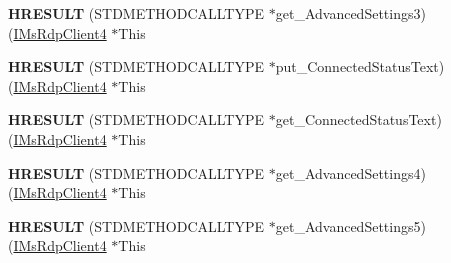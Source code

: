 \begin{DoxyCompactItemize}
\item 
\mbox{\label{struct_m_s_t_s_c_lib_1_1_i_ms_rdp_client4_vtbl_a762e2160b5d5edd9b0a4a5a1e54d4ee4}} 
{\bfseries H\+R\+E\+S\+U\+LT} (S\+T\+D\+M\+E\+T\+H\+O\+D\+C\+A\+L\+L\+T\+Y\+PE $\ast$get\+\_\+\+Advanced\+Settings3)(\hyperlink{interface_m_s_t_s_c_lib_1_1_i_ms_rdp_client4}{I\+Ms\+Rdp\+Client4} $\ast$This
\item 
\mbox{\label{struct_m_s_t_s_c_lib_1_1_i_ms_rdp_client4_vtbl_a541134b0de7063e4a7af019ff46db7f2}} 
{\bfseries H\+R\+E\+S\+U\+LT} (S\+T\+D\+M\+E\+T\+H\+O\+D\+C\+A\+L\+L\+T\+Y\+PE $\ast$put\+\_\+\+Connected\+Status\+Text)(\hyperlink{interface_m_s_t_s_c_lib_1_1_i_ms_rdp_client4}{I\+Ms\+Rdp\+Client4} $\ast$This
\item 
\mbox{\label{struct_m_s_t_s_c_lib_1_1_i_ms_rdp_client4_vtbl_a8b44dbcad6ae83ad35ce763c59aec175}} 
{\bfseries H\+R\+E\+S\+U\+LT} (S\+T\+D\+M\+E\+T\+H\+O\+D\+C\+A\+L\+L\+T\+Y\+PE $\ast$get\+\_\+\+Connected\+Status\+Text)(\hyperlink{interface_m_s_t_s_c_lib_1_1_i_ms_rdp_client4}{I\+Ms\+Rdp\+Client4} $\ast$This
\item 
\mbox{\label{struct_m_s_t_s_c_lib_1_1_i_ms_rdp_client4_vtbl_ac22394ffcf9e4ce2fe624121bd734022}} 
{\bfseries H\+R\+E\+S\+U\+LT} (S\+T\+D\+M\+E\+T\+H\+O\+D\+C\+A\+L\+L\+T\+Y\+PE $\ast$get\+\_\+\+Advanced\+Settings4)(\hyperlink{interface_m_s_t_s_c_lib_1_1_i_ms_rdp_client4}{I\+Ms\+Rdp\+Client4} $\ast$This
\item 
\mbox{\label{struct_m_s_t_s_c_lib_1_1_i_ms_rdp_client4_vtbl_a490710d73a945e2c19514c79a2fd7fd4}} 
{\bfseries H\+R\+E\+S\+U\+LT} (S\+T\+D\+M\+E\+T\+H\+O\+D\+C\+A\+L\+L\+T\+Y\+PE $\ast$get\+\_\+\+Advanced\+Settings5)(\hyperlink{interface_m_s_t_s_c_lib_1_1_i_ms_rdp_client4}{I\+Ms\+Rdp\+Client4} $\ast$This
\end{DoxyCompactItemize}
